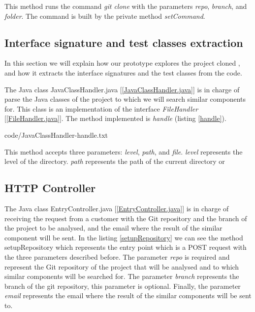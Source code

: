 This method runs the command \emph{git clone} with the parameters \emph{repo}, \emph{branch}, and \emph{folder}. The command is built by the private method \emph{setCommand}.

\subsection{Interface signature and test classes extraction}
\label{code-analysis}
In this section we will explain how our prototype explores the project cloned , and how it extracts the interface signatures and the test classes from the code. 



The Java class JavaClassHandler.java [\ref{JavaClassHandler.java}] is in charge of parse the Java classes of the project to which we will search similar components for. This class is an implementation of the interface \emph{FileHandler} [\ref{FileHandler.java}]. The method implemented is \emph{handle} (listing \ref{handle}).


{code/JavaClassHandler-handle.txt}

This method accepts three parameters: \emph{level}, \emph{path}, and \emph{file}. \emph{level} represents the level of the directory. \emph{path} represents the path of the current directory or 

\subsection{HTTP Controller}
The Java class EntryController.java [\ref{EntryController.java}] is in charge of receiving the request from a customer with the Git repository and the branch of the project to be analysed, and the email where the result of the similar component will be sent. In the listing \ref{setupRepository} we can see the method setupRepository which represents the entry point which is a POST request with the three parameters described before. The parameter \emph{repo} is required and represent the Git repository of the project that will be analysed and to which similar components will be searched for. The parameter \emph{branch} represents the branch of the git repository, this parameter is optional. Finally, the parameter \emph{email} represents the email where the result of the similar components will be sent to.

